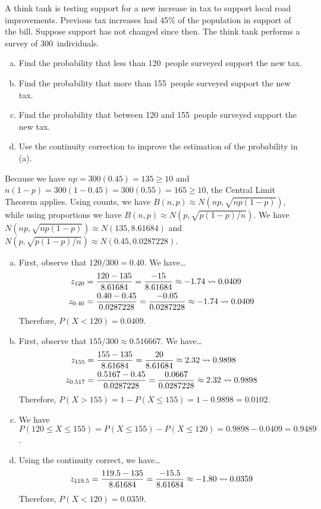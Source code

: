 \documentclass[11pt,letterpaper]{article}
\begin{document}
\newpage



 A think tank is testing support for a new increase in tax to support local road improvements. Previous tax increases had 45\% of the population in support of the bill. Suppose support has not changed since then. The think tank performs a survey of 300~individuals. 
	\begin{enumerate}[(a)]
	\item Find the probability that less than 120~people surveyed support the new tax.
	\item Find the probability that more than 155~people surveyed support the new tax.
	\item Find the probability that between 120 and 155~people surveyed support the new tax.
	\item Use the continuity correction to improve the estimation of the probability in (a).
	\end{enumerate} \pspace

\sol Because we have $np= 300(0.45)= 135 \geq 10$ and $n(1 - p)= 300(1 - 0.45)= 300(0.55)= 165 \geq 10$, the Central Limit Theorem applies. Using counts, we have $B(n, p) \approx N(np, \sqrt{np(1 - p)})$, while using proportions we have $B(n, p) \approx N(p, \sqrt{p(1 - p)/n})$. We have $N(np, \sqrt{np(1 - p)}) \approx N(135, 8.61684)$ and $N(p, \sqrt{p(1 - p)/n}) \approx N(0.45, 0.0287228)$. 

\begin{enumerate}[(a)]
\item First, observe that $120/300= 0.40$. We have\dots
	\[
	\begin{aligned}
	z_{120}&= \dfrac{120 - 135}{8.61684}= \dfrac{-15}{8.61684} \approx -1.74 \rightsquigarrow 0.0409 \\
	z_{0.40}&= \dfrac{0.40 - 0.45}{0.0287228}= \dfrac{-0.05}{0.0287228} \approx -1.74 \rightsquigarrow 0.0409
	\end{aligned}
	\]
Therefore, $P(X < 120)= 0.0409$. \pspace

\item First, observe that $155/300 \approx 0.516667$. We have\dots
	\[
	\begin{aligned}
	z_{155}&= \dfrac{155 - 135}{8.61684}= \dfrac{20}{8.61684} \approx 2.32 \rightsquigarrow 0.9898 \\
	z_{0.517}&= \dfrac{0.5167 - 0.45}{0.0287228}= \dfrac{0.0667}{0.0287228} \approx 2.32 \rightsquigarrow 0.9898
	\end{aligned}
	\]
Therefore, $P(X > 155)= 1 - P(X \leq 155)= 1 - 0.9898= 0.0102$. \pspace

\item We have $P(120 \leq X \leq 155)= P(X \leq 155) - P(X \leq 120)= 0.9898 - 0.0409= 0.9489$. \pspace

\item Using the continuity correct, we have\dots	
	\[
	z_{119.5}= \dfrac{119.5 - 135}{8.61684}= \dfrac{-15.5}{8.61684} \approx -1.80 \rightsquigarrow 0.0359
	\]
Therefore, $P(X < 120)= 0.0359$. 
\end{enumerate}
\end{document}
